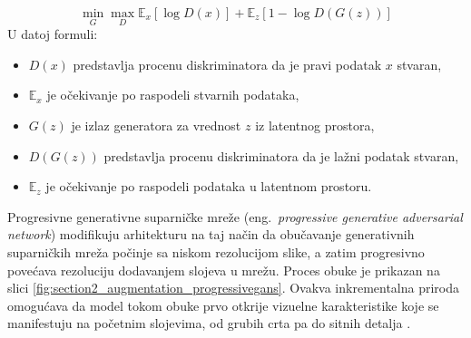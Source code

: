 \documentclass[12pt,oneside]{memoir}
\begin{document}
\begin{equation}
   \min_{G}\max_{D}\mathbb{E}_{x}[\log{D(x)}] +  \mathbb{E}_{z}[1 - \log{D(G(z))}]
\end{equation}
U datoj formuli:
\begin{itemize}
    \item $D(x)$ predstavlja procenu diskriminatora da je pravi podatak $x$ stvaran,
    \item $\mathbb{E}_{x}$ je očekivanje po raspodeli stvarnih podataka,
    \item $G(z)$ je izlaz generatora za vrednost $z$ iz latentnog prostora,
    \item $D(G(z))$ predstavlja procenu diskriminatora da je lažni podatak stvaran,
    \item $\mathbb{E}_{z}$ je očekivanje po raspodeli podataka u latentnom prostoru.
\end{itemize}


Progresivne generativne suparničke mreže (eng.~\textit{progressive generative adversarial network}) modifikuju arhitekturu na taj način da obučavanje generativnih suparničkih mreža počinje sa niskom rezolucijom slike, a zatim progresivno povećava rezoluciju dodavanjem slojeva u mrežu. Proces obuke je prikazan na slici \ref{fig:section2_augmentation_progressivegans}.
Ovakva inkrementalna priroda omogućava da model tokom obuke prvo otkrije vizuelne karakteristike koje se manifestuju na početnim slojevima, od grubih crta pa do sitnih detalja \cite{karras2017progressive}.
\end{document}
